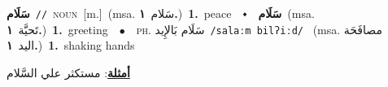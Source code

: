 \documentclass[10pt,a4paper,twoside]{article} %
\begin{document}
\begin{multicols}{2}
{\setlength\topsep{0pt}\textbf{\foreignlanguage{arabic}{سَلَام}}\ {\color{gray}\texttt{//}\color{black}}\ \textsc{noun}\ [m.]\ \color{gray}(msa. \foreignlanguage{arabic}{سَلام}~\foreignlanguage{arabic}{\textbf{١.}})\color{black}\ \textbf{1.}~peace\ \ $\smblkdiamond$\ \ \setlength\topsep{0pt}\textbf{\foreignlanguage{arabic}{سَلَام}}\ \color{gray}(msa. \foreignlanguage{arabic}{تَحيَّة}~\foreignlanguage{arabic}{\textbf{١.}})\color{black}\ \textbf{1.}~greeting\ \ $\bullet$\ \ \textsc{ph.} \color{gray} \foreignlanguage{arabic}{سَلَام بَالإِيد}\color{black}\ {\color{gray}\texttt{/{\sffamily salaːm bilʔiːd}/}\color{black}}\ \color{gray} (msa. \foreignlanguage{arabic}{مصافَحَة اليد}~\foreignlanguage{arabic}{\textbf{١.}})\color{black}\ \textbf{1.}~shaking hands\  \begin{flushright}\color{gray}\foreignlanguage{arabic}{\textbf{\underline{\foreignlanguage{arabic}{أمثلة}}}: مستكثر علي السَّلام}\end{flushright}\color{black}} \vspace{2mm}


\end{multicols}
\end{document}
